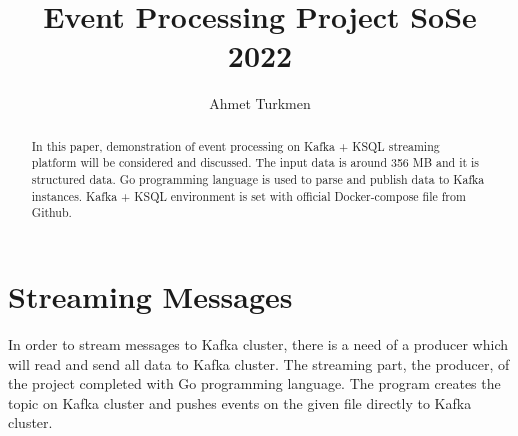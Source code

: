 \documentclass[sigplan,screen]{acmart}
\begin{document}
\title{Event Processing Project SoSe 2022}

\author{Ahmet Turkmen}


\renewcommand{\shortauthors}{Ahmet Turkmen}

\begin{abstract}
In this paper, demonstration of event processing on Kafka + KSQL streaming platform will be considered and discussed. The input data is around 356 MB and it is structured data. 
Go programming language is used to parse and publish data to Kafka instances. Kafka + KSQL environment is set with official Docker-compose file from Github.
\end{abstract}

\maketitle

\section{Streaming Messages}

In order to stream messages to Kafka cluster, there is a need of a producer which will read and send all data to Kafka cluster. The streaming part, the producer,  of the project completed with Go programming language. 
The program creates the topic on Kafka cluster and pushes events on the given file directly to Kafka cluster. 
\end{document}
